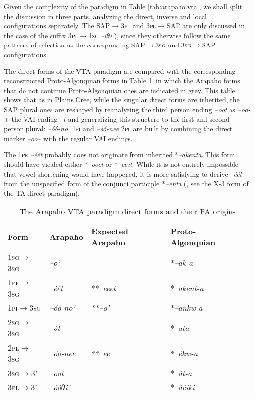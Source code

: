 \documentclass[twoside,a4paper,11pt]{article}
\newcommand{\ipa}[1]{{\phon\textit{#1}}}
\newcommand{\sg}{\textsc{sg}}
\newcommand{\pl}{\textsc{pl}}
\newcommand{\grise}[1]{\cellcolor{lightgray}\textbf{#1}}
\newcommand{\pli}{\textsc{pi}}
\newcommand{\pe}{\textsc{pe}}
\begin{document}
Given the complexity of the paradigm in Table \ref{tab:arapaho.vta}, we shall split the discussion  in three parts, analyzing the direct, inverse and local configurations separately. The SAP$\rightarrow$3\pl{} and 3\pl{}$\rightarrow$SAP are only discussed in the case of the suffix 3\pl{}$\rightarrow$1\sg{} \ipa{--iθi'}), since they otherwise follow the same patterns of refection as the  corresponding SAP$\rightarrow$3\sg{} and 3\sg{}$\rightarrow$SAP configurations.

The direct forms of the VTA paradigm are compared with the corresponding reconstructed Proto-Algonquian forms in Table \ref{tab:arapaho.vta.1}, in which the Arapaho forms that do not continue Proto-Algonquian ones are indicated in grey. This table shows that as in Plains Cree, while the singular direct forms are inherited, the SAP plural ones are reshaped by reanalyzing the third person ending \ipa{--oot} as \ipa{--oo-} + the VAI ending \ipa{--t} and generalizing this structure to the first and second person plural: \ipa{--óó-no'} 1\pli{} and \ipa{--óó-nee} 2\pl{} are built by combining the direct marker \ipa{--oo--} with the regular VAI endings.

The 1\pe{} \ipa{--éét} probably does not originate from inherited  *\ipa{--akenta}. This form should have yielded  either *\ipa{--ooot} or *\ipa{--eeet}. While it is not entirely impossible that vowel shortening would have happened, it is more satisfying to derive  \ipa{--éét}  from the unspecified form of the conjunct participle  *\ipa{--enta} (\citealt[4]{goddard98morphology.arapaho}, see the X-3 form of the TA direct paradigm).

\begin{table}[H]
\caption{The Arapaho VTA paradigm direct forms and their PA origins}
\centering \label{tab:arapaho.vta.1}
\begin{tabular}{lllll}
\toprule
Form& Arapaho & Expected Arapaho & Proto-Algonquian \\
\midrule
 1\sg{}$\rightarrow$3\sg{} & 	\ipa{--o'} & 	 & 	*\ipa{--ak-a} & 		\\		
1\pe{}$\rightarrow$3\sg{} & 	\ipa{--éét}\grise{} & 	**\ipa{--eeet}&  *\ipa{--akent-a} & 		\\		
1\pli{}$\rightarrow$3\sg{} & 	\ipa{--óó-no'}\grise{} & 	**\ipa{--o'}& *\ipa{--ankw-a} & 		\\		
\midrule
2\sg{}$\rightarrow$3\sg{} & 	\ipa{--ót} && 	*\ipa{--ata} & 		\\		
2\pl{}$\rightarrow$3\sg{} & 	\ipa{--óó-nee} \grise{}& 	**\ipa{--ee}& *\ipa{--êkw-a} & 		\\		
\midrule
3\sg{}$\rightarrow$3' & 	\ipa{--oot} & 	&*\ipa{--ât-a} & 		\\		
3\pl{}$\rightarrow$3' & 	\ipa{--óóθi'} & &	*\ipa{--âčiki} & 		\\		
\bottomrule
\end{tabular}
\end{table}
\end{document}
